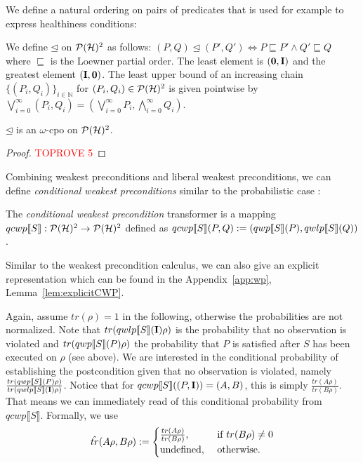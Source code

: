 \documentclass[a4paper,UKenglish,cleveref, autoref, thm-restate]{lipics-v2021}
\begin{document}
We define a natural ordering on pairs of predicates that is used for example to express healthiness conditions:
\begin{definition}
We define $\unlhd$ on $\mathcal{P}(\mathcal{H})^2$ as follows: $
    (P,Q) \unlhd (P',Q') \Leftrightarrow P \sqsubseteq P' \land Q' \sqsubseteq Q$
where $\sqsubseteq$ is the Loewner partial order. The least element is $(\mathbf{0},\textbf{I})$ and the greatest element $(\textbf{I},\mathbf{0})$.
The least upper bound of an increasing chain $\{(P_i,Q_i)\}_{i\in \mathbb{N}}$ for $(P_i,Q_i)\in \mathcal{P}(\mathcal{H})^2$ is given pointwise by
$\bigvee_{i=0}^\infty (P_i,Q_i) = (\bigvee_{i=0}^\infty P_i ,\bigwedge_{i=0}^\infty Q_i)$.
\end{definition}
\begin{lemma}
    $\unlhd$ is an $\omega$-cpo on $\mathcal{P}(\mathcal{H})^2$.
\end{lemma}
\begin{proof}\textcolor{red}{TOPROVE 5}\end{proof}
Combining weakest preconditions and liberal weakest preconditions, we can define \emph{conditional weakest preconditions} similar to the probabilistic case \cite{conditioningProb}:
\begin{definition}
    \label{def:qcwp}
    The \emph{conditional weakest precondition} transformer is a mapping $qcwp\llbracket S \rrbracket: \mathcal{P}(\mathcal{H})^2\to \mathcal{P}(\mathcal{H})^2$ defined as $
    qcwp\llbracket S \rrbracket (P,Q) := (qwp\llbracket S \rrbracket (P), qwlp\llbracket S \rrbracket (Q))$.
\end{definition}
Similar to the weakest precondition calculus, we can also give an explicit representation which can be found in the Appendix~\ref{app:wp}, Lemma~\ref{lem:explicitCWP}.


Again, assume $tr(\rho)=1$ in the following, otherwise the probabilities are not normalized.
Note that $tr(qwlp\llbracket S \rrbracket (\textbf{I})\rho)$ is the probability that no observation is violated and $tr(qwp\llbracket S \rrbracket (P)\rho)$ the probability that $P$ is satisfied after $S$ has been executed on $\rho$ (see above). We are interested in the conditional probability of establishing the postcondition given that no observation is violated, namely $\frac{tr(qwp\llbracket S \rrbracket (P)\rho)}{tr(qwlp\llbracket S \rrbracket (\textbf{I})\rho)}$. Notice that for $qcwp\llbracket S \rrbracket ((P,\textbf{I}))=(A,B)$, this is simply $\frac{tr(A\rho)}{tr(B\rho)}$. That means we can immediately read of this conditional probability from $qcwp\llbracket S \rrbracket$. Formally, we use \begin{align*}
    \hat{tr}(A\rho,B\rho) := \begin{cases}\frac{tr(A\rho)}{tr(B\rho)}, &\text{ if } tr(B\rho)\neq 0\\
        \text{undefined} ,&\text{ otherwise}.
    \end{cases}
\end{align*}
\end{document}
